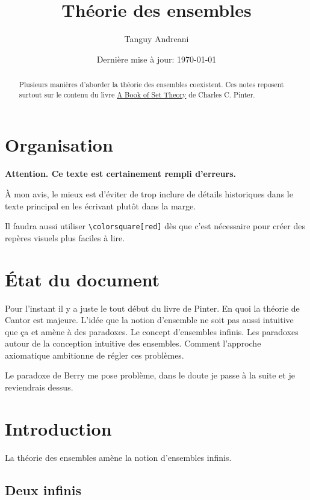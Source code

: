 \documentclass[fleqn,a4paper,nobib]{tufte-handout}
\title{Théorie des ensembles}
\author{Tanguy Andreani}
\date{Dernière mise à jour: \today}
\begin{document}
\maketitle

\begin{abstract}
    Plusieurs manières d'aborder la théorie des ensembles 
    coexistent. Ces notes reposent surtout sur le contenu du
    livre \underline{A Book of Set
    Theory} de Charles C. Pinter.
\end{abstract}

\tableofcontents

\section*{Organisation}

\textbf{Attention. Ce texte est certainement rempli d'erreurs.}

À mon avis, le mieux est d'éviter de trop inclure de
détails historiques dans le texte principal en les écrivant
plutôt dans la marge.

Il faudra aussi utiliser \texttt{\textbackslash colorsquare[red]} dès
que c'est nécessaire pour créer des repères visuels plus
faciles à lire.

\section*{État du document}

Pour l'instant il y a juste le tout début du livre de Pinter.
En quoi la théorie de Cantor est majeure. L'idée que la
notion d'ensemble ne soit pas aussi intuitive que ça et
amène à des paradoxes.
Le concept d'ensembles infinis. Les paradoxes autour de la
conception intuitive des ensembles.
Comment l'approche axiomatique ambitionne de régler ces
problèmes.

Le paradoxe de Berry me pose problème, dans le doute je passe
à la suite et je reviendrais dessus.

\section{Introduction}

La théorie des ensembles amène la notion d'ensembles infinis.

\subsection{Deux infinis}
\end{document}
